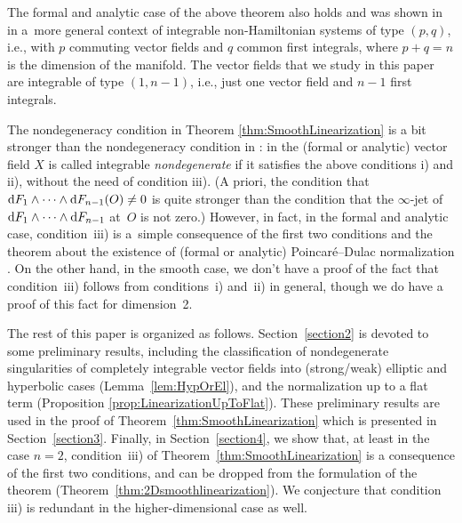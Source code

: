 The formal and analytic case of the above theorem also holds and was shown in \cite{Zung-Nondegenerate2015}
in a~more general context of integrable non-Hamiltonian systems of type $(p,q)$, i.e., with $p$ commuting
vector f\/ields and $q$ common f\/irst integrals, where $p+q = n$ is the dimension of the manifold. The vector f\/ields
that we study in this paper are integrable of type $(1,n-1)$, i.e., just one vector f\/ield and $n-1$ f\/irst integrals.

The nondegeneracy condition in Theorem \ref{thm:SmoothLinearization} is a bit stronger than the nondegeneracy
condition in \cite{Zung-Nondegenerate2015}: in \cite{Zung-Nondegenerate2015} the (formal or analytic)
vector f\/ield $X$ is called integrable \emph{nondegenerate} if it satisf\/ies the above conditions i) and ii), without the
need of condition iii). (A priori, the condition that ${\rm d}F_1 \wedge \dots \wedge {\rm d}F_{n-1}(O) \neq 0$ is quite stronger than the condition that the $\infty$-jet of ${\rm d}F_1 \wedge \dots \wedge {\rm d}F_{n-1}$ at~$O$ is not zero.) However, in fact, in the formal and analytic case, condition~iii) is a~simple consequence of the f\/irst two conditions and the theorem about the existence of (formal or analytic) Poincar\'e--Dulac normalization
\cite{Zung-Poincare2002,Zung-Nondegenerate2015}. On the other hand, in the smooth case,
we don't have a proof of the fact that condition~iii) follows
from conditions~i) and~ii) in general, though we do have a proof of this fact for dimension~2.

The rest of this paper is organized as follows. Section~\ref{section2} is devoted to some preliminary
results, including the classif\/ication
of nondegenerate singularities of completely integrable vector f\/ields into (strong/weak)
elliptic and hyperbolic cases (Lemma~\ref{lem:HypOrEl}), and
the normalization up to a f\/lat term (Proposition \ref{prop:LinearizationUpToFlat}). These preliminary results
are used in the proof of Theo\-rem~\ref{thm:SmoothLinearization} which is presented in Section~\ref{section3}.
Finally, in Section~\ref{section4}, we show that, at least in the case $n=2$, condition~iii) of
Theorem~\ref{thm:SmoothLinearization} is a consequence of the f\/irst two conditions, and can be dropped
from the formulation of the theorem (Theorem~\ref{thm:2Dsmoothlinearization}). We conjecture that
condition iii) is redundant in the higher-dimensional case as well.

